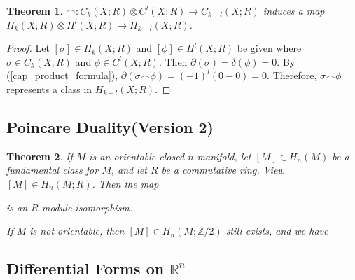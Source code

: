 \documentclass[psamsfonts]{amsart}
\newtheorem{thm}{Theorem}[section]
\theoremstyle{definition}
\theoremstyle{rem}
\numberwithin{equation}{section}
\begin{document}
\begin{thm}
  $\frown: C_k(X; R) \otimes C^l(X; R) \rightarrow C_{k - l}(X; R)$ induces a map $H_k(X; R) \otimes H^l(X; R) \rightarrow H_{k - l}(X; R)$.
\end{thm}

\begin{proof}
  Let $[\sigma] \in H_k(X; R)$ and $[\phi] \in H^l(X; R)$ be given where $\sigma \in C_k(X; R)$ and $\phi \in C^l(X; R)$.
  Then $\partial(\sigma) = \delta(\phi) = 0$.
  By (\ref{cap_product_formula}), $\partial(\sigma \frown \phi) = (-1)^l(0 - 0) = 0$.
  Therefore, $\sigma \frown \phi$ represents a class in $H_{k - l}(X; R)$.
\end{proof}

\subsection{Poincare Duality(Version 2)}

\begin{thm}\label{poincare_duality_2}
  If $M$ is an orientable closed $n$-manifold, let $[M] \in H_n(M)$ be a fundamental class for $M$, and let $R$ be a commutative ring.
  View $[M] \in H_n(M; R)$.
  Then the map
  \begin{center}
  \end{center}
  is an $R$-module isomorphism.

  If $M$ is not orientable, then $[M] \in H_n(M; \mathbb{Z} / 2)$ still exists, and we have
  \begin{center}
  \end{center}
\end{thm}

\subsection{Differential Forms on $\mathbb{R}^n$}
\end{document}
